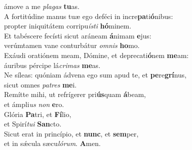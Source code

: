 \oddverse ámove a me \textit{pla}\textit{gas} \textbf{tu}as.\\
\evenverse A fortitúdine manus tuæ ego deféci in incre\textbf{pa}ti\textbf{ó}nibus:~\*\\
\evenverse propter iniquitátem corripu\textit{í}\textit{sti} \textbf{hó}minem.\\
\oddverse Et tabéscere fecísti sicut aráneam \textbf{á}nimam \textbf{e}jus:~\*\\
\oddverse verúmtamen vane conturbátur \textit{om}\textit{nis} \textbf{ho}mo.\\
\evenverse Exáudi oratiónem meam, Dómine, et deprecati\textbf{ó}nem \textbf{me}am:~\*\\
\evenverse áuribus pércipe lá\textit{cri}\textit{mas} \textbf{me}as.\\
\oddverse Ne síleas: quóniam ádvena ego sum apud te, et \textbf{pe}re\textbf{grí}nus,~\*\\
\oddverse sicut omnes \textit{pa}\textit{tres} \textbf{me}i.\\
\evenverse Remítte mihi, ut refrígerer pri\textbf{ús}quam \textbf{á}beam,~\*\\
\evenverse et ámpli\textit{us} \textit{non} \textbf{e}ro.\\
\oddverse Glória \textbf{Pa}tri, et \textbf{Fí}lio,~\*\\
\oddverse et Spirí\textit{tu}\textit{i} \textbf{San}cto.\\
\evenverse Sicut erat in princípio, et \textbf{nunc}, et \textbf{sem}per,~\*\\
\evenverse et in sǽcula sæcu\textit{ló}\textit{rum}. \textbf{A}men.\\
